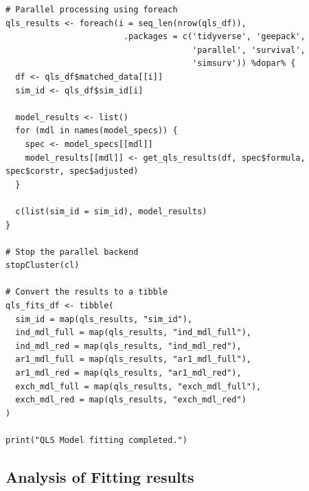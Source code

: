 \documentclass[
]{aft}
\begin{document}
\begin{verbatim}
# Parallel processing using foreach
qls_results <- foreach(i = seq_len(nrow(qls_df)), 
                        .packages = c('tidyverse', 'geepack', 
                                      'parallel', 'survival', 
                                      'simsurv')) %dopar% {
  df <- qls_df$matched_data[[i]]
  sim_id <- qls_df$sim_id[i]
  
  model_results <- list()
  for (mdl in names(model_specs)) {
    spec <- model_specs[[mdl]]
    model_results[[mdl]] <- get_qls_results(df, spec$formula, spec$corstr, spec$adjusted)
  }
  
  c(list(sim_id = sim_id), model_results)
}

# Stop the parallel backend
stopCluster(cl)

# Convert the results to a tibble
qls_fits_df <- tibble(
  sim_id = map(qls_results, "sim_id"),
  ind_mdl_full = map(qls_results, "ind_mdl_full"), 
  ind_mdl_red = map(qls_results, "ind_mdl_red"), 
  ar1_mdl_full = map(qls_results, "ar1_mdl_full"), 
  ar1_mdl_red = map(qls_results, "ar1_mdl_red"), 
  exch_mdl_full = map(qls_results, "exch_mdl_full"), 
  exch_mdl_red = map(qls_results, "exch_mdl_red")
)

print("QLS Model fitting completed.")
\end{verbatim}

\newpage

\subsection{Analysis of Fitting
results}\label{analysis-of-fitting-results}
\end{document}
